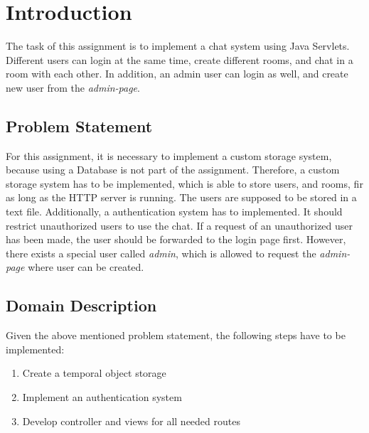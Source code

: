 \section{Introduction}\label{sec:01_intro}
The task of this assignment is to implement a chat system using Java Servlets.
Different users can login at the same time, create different rooms, and chat in a room with each other.
In addition, an admin user can login as well, and create new user from the \textit{admin-page}.


\subsection{Problem Statement}\label{subsec:01_intro_problemstatement}
For this assignment, it is necessary to implement a custom storage system, because using a Database is not part of the assignment.
Therefore, a custom storage system has to be implemented, which is able to store users, and rooms, fir as long as the HTTP server is running. The users are supposed to be stored in a text file.
Additionally, a authentication system has to implemented. It should restrict unauthorized users to use the chat. If a request of an
unauthorized user has been made, the user should be forwarded to the login page first.
However, there exists a special user called \textit{admin}, which is allowed to request the \textit{admin-page} where user can be created.


\subsection{Domain Description}\label{subsec:01_intro_domaindescription}



Given the above mentioned problem statement, the following steps have to be implemented:
\begin{enumerate}
\item Create a temporal object storage
\item Implement an authentication system
\item Develop controller and views for all needed routes
\end{enumerate}



